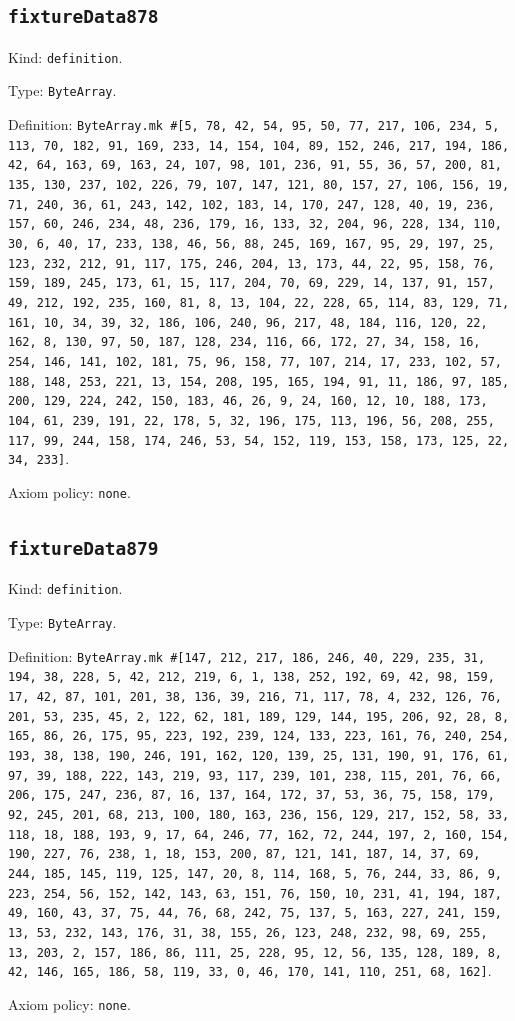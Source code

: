 \documentclass[11pt]{article}
\begin{document}
\subsection*{\texttt{fixtureData878}}
\noindent Kind: \texttt{definition}.\par
\noindent Type: \texttt{ByteArray}.\par
\noindent Definition: \texttt{ByteArray.mk \#[5, 78, 42, 54, 95, 50, 77, 217, 106, 234, 5, 113, 70, 182, 91, 169, 233, 14, 154, 104, 89, 152, 246, 217, 194, 186, 42, 64, 163, 69, 163, 24, 107, 98, 101, 236, 91, 55, 36, 57, 200, 81, 135, 130, 237, 102, 226, 79, 107, 147, 121, 80, 157, 27, 106, 156, 19, 71, 240, 36, 61, 243, 142, 102, 183, 14, 170, 247, 128, 40, 19, 236, 157, 60, 246, 234, 48, 236, 179, 16, 133, 32, 204, 96, 228, 134, 110, 30, 6, 40, 17, 233, 138, 46, 56, 88, 245, 169, 167, 95, 29, 197, 25, 123, 232, 212, 91, 117, 175, 246, 204, 13, 173, 44, 22, 95, 158, 76, 159, 189, 245, 173, 61, 15, 117, 204, 70, 69, 229, 14, 137, 91, 157, 49, 212, 192, 235, 160, 81, 8, 13, 104, 22, 228, 65, 114, 83, 129, 71, 161, 10, 34, 39, 32, 186, 106, 240, 96, 217, 48, 184, 116, 120, 22, 162, 8, 130, 97, 50, 187, 128, 234, 116, 66, 172, 27, 34, 158, 16, 254, 146, 141, 102, 181, 75, 96, 158, 77, 107, 214, 17, 233, 102, 57, 188, 148, 253, 221, 13, 154, 208, 195, 165, 194, 91, 11, 186, 97, 185, 200, 129, 224, 242, 150, 183, 46, 26, 9, 24, 160, 12, 10, 188, 173, 104, 61, 239, 191, 22, 178, 5, 32, 196, 175, 113, 196, 56, 208, 255, 117, 99, 244, 158, 174, 246, 53, 54, 152, 119, 153, 158, 173, 125, 22, 34, 233]}.\par
\noindent Axiom policy: \texttt{none}.\par
\subsection*{\texttt{fixtureData879}}
\noindent Kind: \texttt{definition}.\par
\noindent Type: \texttt{ByteArray}.\par
\noindent Definition: \texttt{ByteArray.mk \#[147, 212, 217, 186, 246, 40, 229, 235, 31, 194, 38, 228, 5, 42, 212, 219, 6, 1, 138, 252, 192, 69, 42, 98, 159, 17, 42, 87, 101, 201, 38, 136, 39, 216, 71, 117, 78, 4, 232, 126, 76, 201, 53, 235, 45, 2, 122, 62, 181, 189, 129, 144, 195, 206, 92, 28, 8, 165, 86, 26, 175, 95, 223, 192, 239, 124, 133, 223, 161, 76, 240, 254, 193, 38, 138, 190, 246, 191, 162, 120, 139, 25, 131, 190, 91, 176, 61, 97, 39, 188, 222, 143, 219, 93, 117, 239, 101, 238, 115, 201, 76, 66, 206, 175, 247, 236, 87, 16, 137, 164, 172, 37, 53, 36, 75, 158, 179, 92, 245, 201, 68, 213, 100, 180, 163, 236, 156, 129, 217, 152, 58, 33, 118, 18, 188, 193, 9, 17, 64, 246, 77, 162, 72, 244, 197, 2, 160, 154, 190, 227, 76, 238, 1, 18, 153, 200, 87, 121, 141, 187, 14, 37, 69, 244, 185, 145, 119, 125, 147, 20, 8, 114, 168, 5, 76, 244, 33, 86, 9, 223, 254, 56, 152, 142, 143, 63, 151, 76, 150, 10, 231, 41, 194, 187, 49, 160, 43, 37, 75, 44, 76, 68, 242, 75, 137, 5, 163, 227, 241, 159, 13, 53, 232, 143, 176, 31, 38, 155, 26, 123, 248, 232, 98, 69, 255, 13, 203, 2, 157, 186, 86, 111, 25, 228, 95, 12, 56, 135, 128, 189, 8, 42, 146, 165, 186, 58, 119, 33, 0, 46, 170, 141, 110, 251, 68, 162]}.\par
\noindent Axiom policy: \texttt{none}.\par
\end{document}
